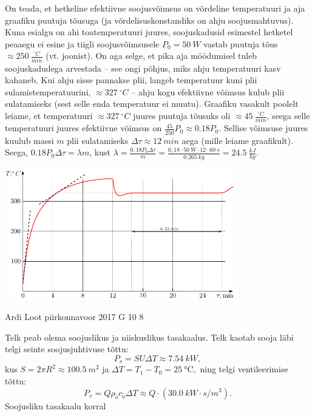 \documentclass[11pt, twoside]{article}
\begin{document}
{{\ifSolution
On teada, et hetkeline efektiivne soojusvõimsus on võrdeline temperatuuri ja aja graafiku puutuja tõusuga (ja võrdelisuskonstandiks on ahju soojusmahtuvus). Kuna esialgu on ahi toatemperatuuri juures, soojuskadusid esimestel hetketel peaaegu ei esine ja tiigli soojusvõimsusele $P_0 = \SI{50}{W}$ vastab puutuja tõus $\approx \SI{250}{\frac{^{\circ}C} {min}}$ (vt. joonist). On aga selge, et pika aja möödumisel tuleb soojuskadudega arvestada -- see ongi põhjus, miks ahju temperatuuri kasv kahaneb. Kui ahju sisse pannakse plii, langeb temperatuur kuni plii sulamistemperatuurini, $\approx \SI{327}{^\circ C}$ -- ahju kogu efektiivne võimsus kulub plii sulatamiseks (sest selle enda temperatuur ei muutu). Graafiku vasakult poolelt leiame, et temperatuuri $\approx \SI{327}{^\circ C}$ juures puutuja tõusuks oli $\approx \SI{45}{\frac{^{\circ}C} {min}}$, seega selle temperatuuri juures efektiivne võimsus on $\frac{45}{250}P_0 \approx \num{0.18}P_0$. Sellise võimsuse juures kuulub massi $m$ plii sulatamiseks $\Delta\tau \approx \SI{12}{min}$ aega (mille leiame graafikult). Seega, $\num{0.18} P_0 \Delta\tau = \lambda m$, kust $\lambda = \frac{0,18 P_0 \Delta \tau}{ m} = \frac{0,18 \cdot \SI{50}{W} \cdot 12 \cdot \SI{60}{s}}{\SI{0.265}{kg}} = \SI{24.5}{\frac{kJ}{kg}}$.
\begin{center}
\includegraphics[width = 0.75\textwidth]{2012-v3g-07-ahi_lah}
\end{center}
\fi
}

{Ardi Loot} %
{piirkonnavoor} %
{2017} %
{G 10} %
{8} %
{

\ifSolution
Telk peab olema soojuslikus ja niiskuslikus tasakaalus. Telk kaotab
sooja läbi telgi seinte soojusjuhtivuse tõttu:
\[
P_{s}=SU\Delta T\approx\SI{7.54}{kW},
\]
kus $S=2\pi R^{2}\approx\SI{100.5}{m^{2}}$
ja $\Delta T=T_{1}-T_{0}=\SI{25}{\celsius},$ ning telgi ventileerimise tõttu:
\[
P_{v}=Q\rho_{\tilde{o}}c_{\tilde{o}}\Delta T\approx Q\cdot\left(\SI{30.0}{kW\cdot s/m^{3}}\right).
\]
Soojusliku tasakaalu korral

}}
\end{document}
